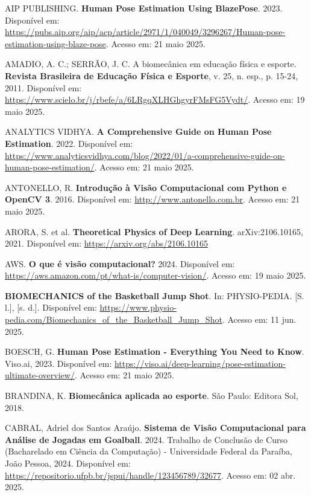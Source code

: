 \makeatletter
{}
\makeatother
\printbibliography

\begin{flushleft}
\setlength{\parskip}{1em}
\renewcommand{\baselinestretch}{1.0}\selectfont
\setlength{\parskip}{\baselineskip}

AIP PUBLISHING. \textbf{Human Pose Estimation Using BlazePose}. 2023. Disponível em: \url{https://pubs.aip.org/aip/acp/article/2971/1/040049/3296267/Human-pose-estimation-using-blaze-pose}. Acesso em: 21 maio 2025.

AMADIO, A. C.; SERRÃO, J. C. A biomecânica em educação física e esporte. \textbf{Revista Brasileira de Educação Física e Esporte}, v. 25, n. esp., p. 15-24, 2011. Disponível em: \url{https://www.scielo.br/j/rbefe/a/6LRgqXLHGhgyrFMsFG5Vydt/}. Acesso em: 19 maio 2025.

ANALYTICS VIDHYA. \textbf{A Comprehensive Guide on Human Pose Estimation}. 2022. Disponível em: \url{https://www.analyticsvidhya.com/blog/2022/01/a-comprehensive-guide-on-human-pose-estimation/}. Acesso em: 21 maio 2025.

ANTONELLO, R. \textbf{Introdução à Visão Computacional com Python e OpenCV 3}. 2016. Disponível em: \url{http://www.antonello.com.br}. Acesso em: 21 maio 2025.

ARORA, S. et al. \textbf{Theoretical Physics of Deep Learning}. arXiv:2106.10165, 2021. Disponível em: \url{https://arxiv.org/abs/2106.10165}

AWS. \textbf{O que é visão computacional?} 2024. Disponível em: \url{https://aws.amazon.com/pt/what-is/computer-vision/}. Acesso em: 19 maio 2025.

\textbf{BIOMECHANICS of the Basketball Jump Shot}. In: PHYSIO-PEDIA. [S. l.], [s. d.]. Disponível em: \url{https://www.physio-pedia.com/Biomechanics_of_the_Basketball_Jump_Shot}. Acesso em: 11 jun. 2025.

BOESCH, G. \textbf{Human Pose Estimation - Everything You Need to Know}. Viso.ai, 2023. Disponível em: \url{https://viso.ai/deep-learning/pose-estimation-ultimate-overview/}. Acesso em: 21 maio 2025.

BRANDINA, K. \textbf{Biomecânica aplicada ao esporte}. São Paulo: Editora Sol, 2018.

CABRAL, Adriel dos Santos Araújo. \textbf{Sistema de Visão Computacional para Análise de Jogadas em Goalball}. 2024. Trabalho de Conclusão de Curso (Bacharelado em Ciência da Computação) - Universidade Federal da Paraíba, João Pessoa, 2024. Disponível em: \url{https://repositorio.ufpb.br/jspui/handle/123456789/32677}. Acesso em: 02 abr. 2025.


\end{flushleft}
